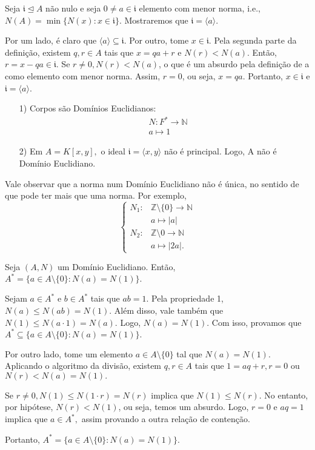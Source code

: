 \documentclass[AlgebraII/algebraII_notes.tex]{subfiles}
\begin{document}
\begin{proof*}
	Seja \(\mathfrak{i} \trianglelefteq{A}\) não nulo e seja \(0\neq a\in \mathfrak{i}\) elemento com
	menor norma, i.e., \(N(A) = \min\{N(x): x\in \mathfrak{i}\}\). Mostraremos que \(\mathfrak{i} = \langle a \rangle\).

	Por um lado, é claro que \(\langle a \rangle \subseteq{\mathfrak{i}}.\) Por outro, tome \(x\in \mathfrak{i}\).
	Pela segunda parte da definição, existem \(q, r\in A\) tais que \( x = qa + r\) e \(N(r) < N(a).\)
	Então, \(r=x-qa\in \mathfrak{i}.\) Se \(r\neq0, N(r) < N(a)\), o que é um absurdo pela definição de a como
	elemento com menor norma. Assim, \(r=0\), ou seja, \(x = qa\). Portanto, \(x\in \mathfrak{i}\) e \(\mathfrak{i} = \langle a \rangle\). \qedsymbol
\end{proof*}
\begin{example}
	\begin{itemize}
		\item[1)] Corpos são Domínios Euclidianos:
		      \begin{align*}
			       & N:F^{*}\rightarrow \mathbb{N} \\
			       & a\mapsto 1
		      \end{align*}
		\item[2)] Em \(A = K[x, y],\) o ideal \(\mathfrak{i} = \langle x, y \rangle\) não é principal. Logo, A não é Domínio Euclidiano.
	\end{itemize}
\end{example}
Vale observar que a norma num Domínio Euclidiano não é única, no sentido de que pode ter mais que uma norma. Por exemplo,
\[
	\left\{\begin{array}{ll}
		N_{1}: & \mathbb{Z}\setminus{\{0\}}\rightarrow \mathbb{N} \\
		       & a\mapsto |a|                                     \\
		N_{2}: & \mathbb{Z}\setminus{0}\rightarrow \mathbb{N}     \\
		       & a\mapsto |2a|.
	\end{array}\right.
\]
\begin{prop*}
	Seja \((A, N)\) um Domínio Euclidiano. Então, \(A^{*}=\{a\in A\setminus{\{0\}}: N(a) = N(1)\}.\)
\end{prop*}
\begin{proof*}
	Sejam \(a\in A^{*}\) e \(b\in A^{*}\) tais que \(ab = 1.\) Pela propriedade 1,
	\(N(a)\leq N(ab) = N(1).\) Além disso, vale também que \(N(1)\leq N(a \cdot 1) = N(a).\) Logo,
	\(N(a) = N(1).\) Com isso, provamos que \(A^{*}\subseteq{\{a\in A\setminus{\{0\}}: N(a) = N(1)\}}.\)

	Por outro lado, tome um elemento \(a\in A\setminus{\{0\}}\) tal que \(N(a) = N(1).\) Aplicando o algoritmo da divisão,
	existem \(q, r\in A\) tais que \(1 = aq + r, r = 0\) ou \(N(r) < N(a) = N(1).\)

	Se \(r\neq0, N(1)\leq N(1 \cdot r) = N(r)\) implica que \(N(1)\leq N(r).\) No entanto, por hipótese,
	\(N(r) < N(1)\), ou seja, temos um absurdo. Logo, \(r = 0\) e \(aq = 1\) implica que \(a\in A^{*},\) assim provando
	a outra relação de contenção.

	Portanto, \(A^{*}=\{a\in A\setminus{\{0\}}: N(a) = N(1)\}.\) \qedsymbol
\end{proof*}
\end{document}
